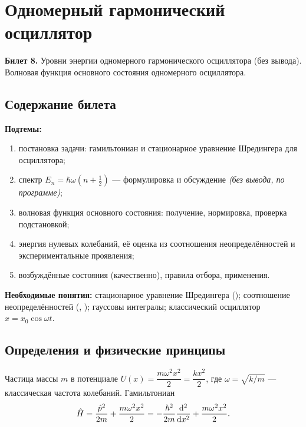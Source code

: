 \chapter[Гармонический осциллятор]%
        {Одномерный гармонический осциллятор}
\label{t:08}

\begin{qbox}
\textbf{Билет 8.} Уровни энергии одномерного гармонического осциллятора (без вывода).
Волновая функция основного состояния одномерного осциллятора.
\end{qbox}

\section{Содержание билета}

\textbf{Подтемы:}
\begin{enumerate}
 \item постановка задачи: гамильтониан и стационарное уравнение Шредингера для осциллятора;
 \item спектр $E_n=\hbar\omega(n+\frac12)$ — формулировка и обсуждение \emph{(без вывода, по программе)};
 \item волновая функция основного состояния: получение, нормировка, проверка подстановкой;
 \item энергия нулевых колебаний, её оценка из соотношения неопределённостей и экспериментальные проявления;
 \item возбуждённые состояния (качественно), правила отбора, применения.
\end{enumerate}

\textbf{Необходимые понятия:} стационарное уравнение Шредингера ();
соотношение неопределённостей (, ); гауссовы интегралы; классический
осциллятор $x=x_0\cos\omega t$.

\section{Определения и физические принципы}

\begin{definition}
Частица массы $m$ в потенциале $U(x)=\dfrac{m\omega^2x^2}{2}=\dfrac{kx^2}{2}$, где $\omega=\sqrt{k/m}$ —
классическая частота колебаний. Гамильтониан
\begin{equation}\label{eq:8:H}
  \hat{H}=\frac{\hat{p}^2}{2m}+\frac{m\omega^2x^2}{2}=-\frac{\hbar^2}{2m}\frac{\mathrm{d} ^2}{\mathrm{d} x^2}+\frac{m\omega^2x^2}{2}.
\end{equation}
\end{definition}

